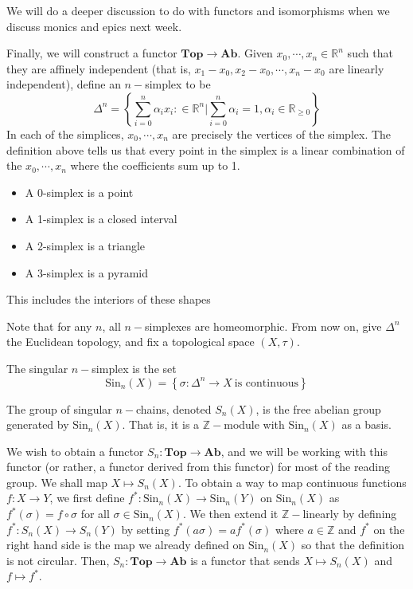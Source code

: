 \documentclass[12pt,reqno]{amsart}
\numberwithin{theorem}{section}
\theoremstyle{definition}
\theoremstyle{remark}
\numberwithin{equation}{section}
\newcommand{\Z}{\mathbb Z}
\newcommand{\set}[1]{\left \{ #1 \right \}}
\theoremstyle{definition}
\newcommand{\Sin}{\mathrm{Sin}}
\begin{document}
We will do a deeper discussion to do with functors and isomorphisms when we discuss monics and epics next week.
\par
Finally, we will construct a functor $\mathbf{Top}\rightarrow \mathbf{Ab}$. Given $x_0,\cdots,x_n \in \mathbb R^n$ such that they are affinely independent (that is, $x_1-x_0,x_2-x_0,\cdots,x_n-x_0$ are linearly independent), define an $n-$simplex to be 
$$\Delta^n = \set{\sum_{i=0}^n\alpha_ix_i: \in \mathbb R^n | \sum_{i=0}^n \alpha_i = 1, \alpha_i\in \mathbb R_{\geq 0}}$$
In each of the simplices, $x_0,\cdots,x_n$ are precisely the vertices of the simplex. The definition above tells us that every point in the simplex is a linear combination of the $x_0,\cdots,x_n$ where the coefficients sum up to 1. 
\begin{example}
    \begin{itemize}
        \item A 0-simplex is a point
        \item A 1-simplex is a closed interval
        \item A 2-simplex is a triangle 
        \item A 3-simplex is a pyramid
    \end{itemize}
    This includes the interiors of these shapes
\end{example}
Note that for any $n$, all $n-$simplexes are homeomorphic. From now on, give $\Delta^n$ the Euclidean topology, and fix a topological space $(X,\tau)$.
\begin{definition}
    The singular $n-$simplex is the set
    $$\Sin_n(X) = \set{\sigma :\Delta^n \rightarrow X \ \text{is continuous}}$$
\end{definition}
\begin{definition}
    The group of singular $n-$chains, denoted $S_n(X)$, is the free abelian group generated by $\Sin_n(X)$. That is, it is a $\Z-$module with $\Sin_n(X)$ as a basis.
\end{definition}
We wish to obtain a functor $S_n:\mathbf{Top}\rightarrow \mathbf{Ab}$, and we will be working with this functor (or rather, a functor derived from this functor) for most of the reading group. We shall map $X \mapsto S_n(X)$. To obtain a way to map continuous functions $f:X\rightarrow Y$, we first define $f^*:\Sin_n(X)\rightarrow \Sin_n(Y)$ on $ \Sin_n(X)$ as $f^*(\sigma)=f\circ \sigma$ for all $\sigma \in \Sin_n(X)$. We then extend it $\Z-$linearly by defining $f^*:S_n(X)\rightarrow S_n(Y)$ by setting $f^*(a\sigma)=af^*(\sigma)$ where $a \in \Z$ and $f^*$ on the right hand side is the map we already defined on $\Sin_n(X)$ so that the definition is not circular. Then, $S_n:\mathbf{Top}\rightarrow \mathbf{Ab}$ is a functor that sends $X \mapsto S_n(X)$ and $f \mapsto f^*$.
\end{document}
